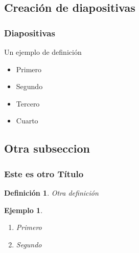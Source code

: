 \documentclass{beamer}
\newtheorem{definicion}{Definición}
\newtheorem{ejemplo}{Ejemplo}
\begin{document}
\subsection{Creación de diapositivas}

\begin{frame}
\frametitle{Diapositivas}

\begin{definition}
  Un ejemplo de definición
\end{definition}

\begin{example}
  \begin{itemize}
    \item <1-> Primero \pause
    \item <2-> Segundo \pause
    \item <3-> Tercero \pause
    \item <4-> Cuarto  
  \end{itemize}
\end{example}

\end{frame}

\subsection{Otra subseccion}
\begin{frame}
\frametitle{Este es otro Título}

\begin{definicion}
  Otra definición 
\end{definicion}

\begin{ejemplo}
  \begin{enumerate}
    \item
      Primero
      \pause

    \item
      Segundo 

  \end{enumerate}
\end{ejemplo}

\end{frame}
\end{document}

